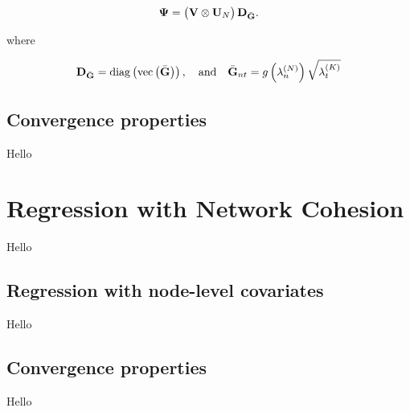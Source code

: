 \begin{equation}
    \mathbf{\Psi} = \big(\mathbf{V} \otimes \mathbf{U}_N \big) \, \mathbf{D}_{\bar{\mathbf{G}}}.
\end{equation}

where 

\begin{equation}
    \mathbf{D}_{\bar{\mathbf{G}}} = \text{\textup{diag}}\left(\text{\textup{vec}}\left(\bar{\mathbf{G}}\right)\right), \quad \text{and} \quad \bar{\mathbf{G}}_{nt} = g\left(\lambda^{(N)}_n\right) \sqrt{\lambda^{(K)}_t} 
\end{equation}


\subsection{Convergence properties}

Hello


\section{Regression with Network Cohesion}

\label{sec:rnc_mdp}

Hello

\subsection{Regression with node-level covariates}

Hello

\subsection{Convergence properties}

Hello